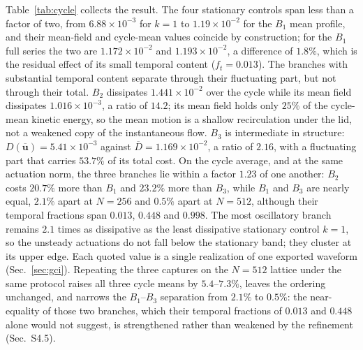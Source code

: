 \documentclass[11pt,a4paper]{article}
\newcommand{\Dbar}{\overline{D}}
\newenvironment{chgadd}{\par\color{blue}}{\par\color{black}}
\begin{document}
\begin{chgadd}
Table~\ref{tab:cycle} collects the result. The four stationary controls span
less than a factor of two, from $6.88\times10^{-3}$ for $k=1$ to
$1.19\times10^{-2}$ for the $B_1$ mean profile, and their mean-field and cycle-mean
values coincide by construction; for the $B_1$ full series the two are
$1.172\times10^{-2}$ and $1.193\times10^{-2}$, a difference of $1.8\%$, which is
the residual effect of its small temporal content ($f_t=0.013$). The branches with
substantial temporal content separate through their fluctuating part, but not
through their total. $B_2$ dissipates $1.441\times10^{-2}$ over the cycle while its
mean field dissipates $1.016\times10^{-3}$, a ratio of $14.2$; its mean field holds
only $25\%$ of the cycle-mean kinetic energy, so the mean motion is a shallow
recirculation under the lid, not a weakened copy of the instantaneous flow. $B_3$
is intermediate in structure: $D(\overline{\mathbf{u}})=5.41\times10^{-3}$ against
$\Dbar=1.169\times10^{-2}$, a ratio of $2.16$, with a fluctuating part that carries
$53.7\%$ of its total cost. On the cycle average, and at the same actuation norm,
the three branches lie within a factor $1.23$ of one another: $B_2$ costs
$20.7\%$ more than $B_1$ and $23.2\%$ more than $B_3$, while $B_1$ and $B_3$ are
nearly equal, $2.1\%$ apart at $N=256$ and $0.5\%$ apart at $N=512$, although their
temporal fractions span $0.013$, $0.448$ and $0.998$.
The most oscillatory branch remains $2.1$ times as dissipative as the least
dissipative stationary control $k=1$, so the unsteady actuations do not fall below
the stationary band; they cluster at its upper edge. Each quoted value is a single
realization of one exported waveform (Sec.~\ref{sec:gci}). Repeating the three
captures on the $N=512$ lattice under the same protocol raises all three cycle
means by $5.4$--$7.3\%$, leaves the ordering unchanged, and narrows the $B_1$--$B_3$
separation from $2.1\%$ to $0.5\%$: the near-equality of those two branches, which
their temporal fractions of $0.013$ and $0.448$ alone would not suggest, is
strengthened rather than weakened by the refinement (Sec.~S4.5).


\end{chgadd}
\end{document}
